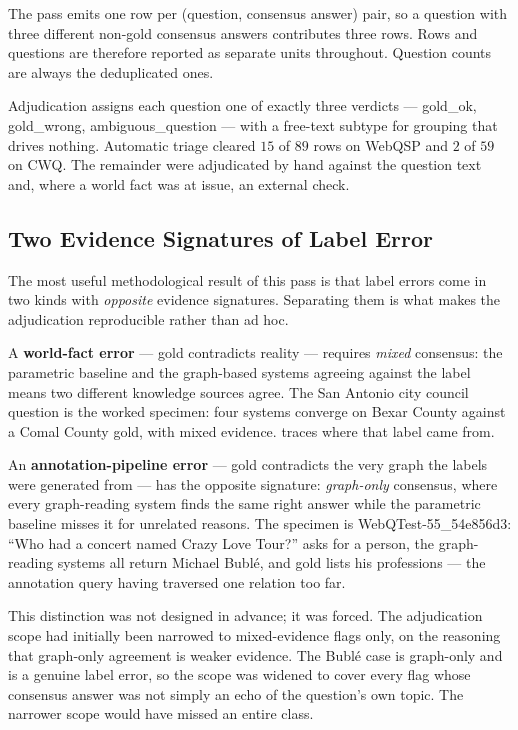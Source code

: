 The pass emits one row per (question, consensus answer) pair, so a question with
three different non-gold consensus answers contributes three rows. Rows and
questions are therefore reported as separate units throughout. Question
counts are always the deduplicated ones.

Adjudication assigns each question one of exactly three verdicts ---
\textsf{gold\_ok}, \textsf{gold\_wrong}, \textsf{ambiguous\_question} --- with a
free-text subtype for grouping that drives nothing. Automatic triage cleared
$15$ of $89$ rows on WebQSP and $2$ of $59$ on CWQ. The remainder were
adjudicated by hand against the question text and, where a world fact was at
issue, an external check.

\subsection{Two Evidence Signatures of Label
Error}\label{sec:evidence-signatures}

The most useful methodological result of this pass is that label errors come in
two kinds with \emph{opposite} evidence signatures. Separating them is
what makes the adjudication reproducible rather than ad hoc.

A \textbf{world-fact error} --- gold contradicts reality --- requires
\emph{mixed} consensus: the parametric baseline and the graph-based systems
agreeing against the label means two different knowledge sources agree. The San
Antonio city council question is the worked specimen: four systems converge on
Bexar County against a Comal County gold, with mixed evidence.
 traces where that label came from.

An \textbf{annotation-pipeline error} --- gold contradicts the very graph the
labels were generated from --- has the opposite signature: \emph{graph-only}
consensus, where every graph-reading system finds the same right answer while
the parametric baseline misses it for unrelated reasons. The specimen is
\textsf{WebQTest-55\_54e856d3}: ``Who had a concert named Crazy Love Tour?''
asks for a person, the graph-reading systems all return Michael Bublé, and gold
lists his professions --- the annotation query having traversed one relation too
far.

This distinction was not designed in advance; it was forced. The adjudication
scope had initially been narrowed to mixed-evidence flags only, on the reasoning
that graph-only agreement is weaker evidence. The Bublé case is graph-only and
is a genuine label error, so the scope was widened to cover every flag whose
consensus answer was not simply an echo of the question's own topic. The
narrower scope would have missed an entire class.

